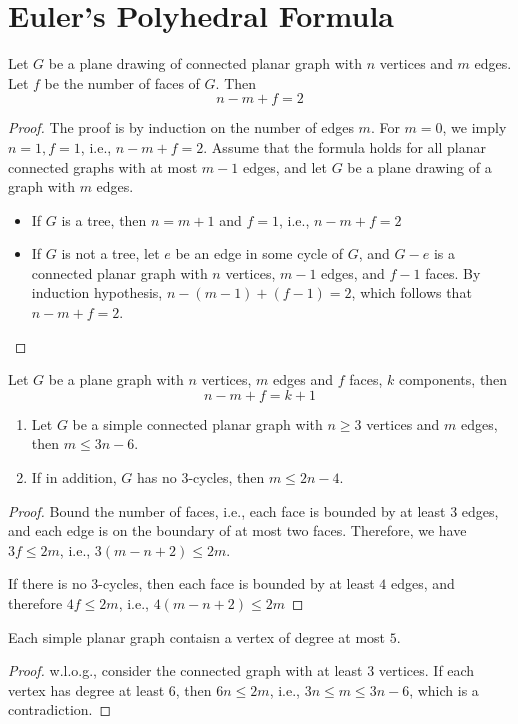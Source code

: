 \section{Euler’s Polyhedral Formula}
\begin{theorem}[Euler]
Let $G$ be a plane drawing of connected planar graph with $n$ vertices and $m$ edges.
Let $f$ be the number of faces of $G$. Then
\[
n-m+f=2
\]
\end{theorem}
\begin{proof}
The proof is by induction on the number of edges $m$.
For $m=0$, we imply $n=1,f=1$, i.e., $n-m+f=2$.
Assume that the formula holds for all planar connected graphs with at most $m-1$ edges, and let $G$ be a plane drawing of a graph with $m$ edges.
\begin{itemize}
\item
If $G$ is a tree, then $n=m+1$ and $f=1$, i.e., $n-m+f=2$
\item
If $G$ is not a tree, let $e$ be an edge in some cycle of $G$, and $G-e$ is a connected planar graph with $n$ vertices, $m-1$ edges, and $f-1$ faces. By induction hypothesis, $n-(m-1)+(f-1)=2$, which follows that $n-m+f=2$.
\end{itemize}
\end{proof}

\begin{corollary}
Let $G$ be a plane graph with $n$ vertices, $m$ edges and $f$ faces, $k$ components, then
\[
n-m+f=k+1
\]
\end{corollary}

\begin{corollary}
\begin{enumerate}
\item
Let $G$ be a simple connected planar graph with $n\ge3$ vertices and $m$ edges, then $m\le 3n-6$.
\item
If in addition, $G$ has no $3$-cycles, then $m\le 2n-4$.
\end{enumerate}
\end{corollary}
\begin{proof}
Bound the number of faces, i.e., each face is bounded by at least 3 edges, and each edge is on the boundary of at most two faces. Therefore, we have $3f\le 2m$, i.e., $3(m-n+2)\le 2m$.

If there is no $3$-cycles, then each face is bounded by at least $4$ edges, and therefore $4f\le 2m$, i.e., $4(m-n+2)\le 2m$
\end{proof}

\begin{corollary}
Each simple planar graph contaisn a vertex of degree at most $5$.
\end{corollary}
\begin{proof}
w.l.o.g., consider the connected graph with at least $3$ vertices.
If each vertex has degree at least $6$, then $6n\le 2m$, i.e., $3n\le m\le 3n-6$, which is a contradiction.
\end{proof}


